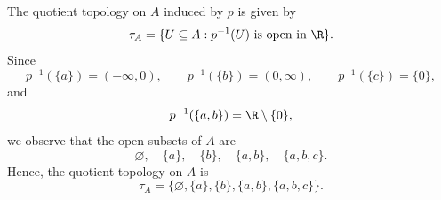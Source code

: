 
The quotient topology on $A$ induced by $p$ is given by
\[ \tau_A=\{U\subseteq A : p^{-1}(U)\text{ is open in }\R\}. \]
Since
\[ p^{-1}(\{a\})=(-\infty,0),\qquad p^{-1}(\{b\})=(0,\infty),\qquad p^{-1}(\{c\})=\{0\}, \]
and
\[ p^{-1}(\{a,b\})=\R\setminus\{0\}, \]
we observe that the open subsets of $A$ are
\[ \varnothing,\quad\{a\},\quad\{b\},\quad\{a,b\},\quad\{a,b,c\}. \]
Hence, the quotient topology on $A$ is
\[ \boxed{\tau_A=\{\varnothing,\{a\},\{b\},\{a,b\},\{a,b,c\}\}.} \]

